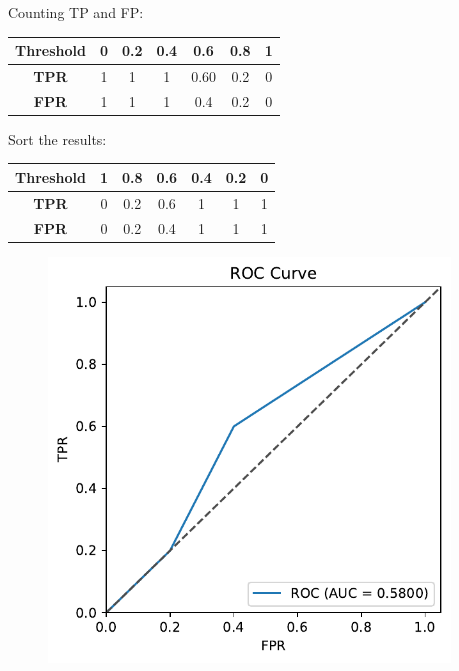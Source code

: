 \documentclass[aspectratio=169, 10pt]{beamer}
\begin{document}
\begin{frame}
\begin{columns}
\begin{column}{0.5\textwidth}
        \end{column}
        \begin{column}{0.5\textwidth}
            
            Counting TP and FP:

            \begin{table}[]
                \begin{tabular}{c|cccccc}
                \textbf{Threshold} & \textbf{0} & \textbf{0.2} & \textbf{0.4} & \textbf{0.6} & \textbf{0.8} & \textbf{1} \\ \hline
                \textbf{TPR}       & 1          & 1            & 1            & 0.60         & 0.2          & 0          \\
                \textbf{FPR}       & 1          & 1            & 1            & 0.4          & 0.2          & 0         
                \end{tabular}
            \end{table}
            
            Sort the results:

            \begin{table}[]
                \begin{tabular}{c|cccccc}
                \textbf{Threshold} & \textbf{1} & \textbf{0.8} & \textbf{0.6} & \textbf{0.4} & \textbf{0.2} & \textbf{0} \\ \hline
                \textbf{TPR}       & 0          & 0.2            & 0.6            & 1         & 1         & 1          \\
                \textbf{FPR}       & 0          & 0.2           & 0.4           & 1          & 1          & 1         
                \end{tabular}
            \end{table}

            \begin{figure}
                \centering
                \includegraphics[width=0.4\columnwidth]{../plots/roc_curve_eg.pdf}
            \end{figure}

        \end{column}
    \end{columns}
\end{frame}
\end{document}
